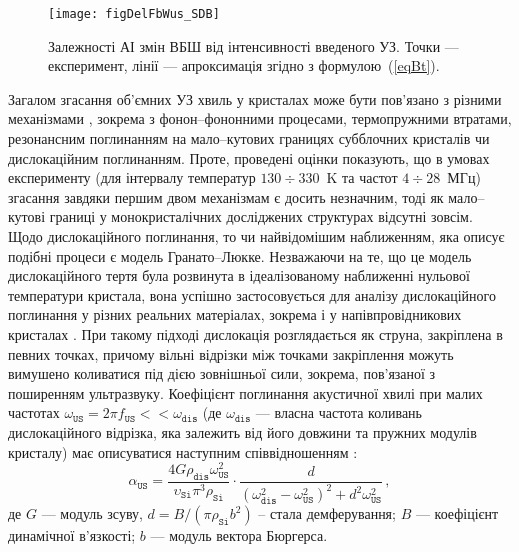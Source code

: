\begin{figure}
\center
\texttt{[image: figDelFbWus\_SDB]}
\caption{\label{figDelFbWus_SDB}
Залежності АІ змін ВБШ від інтенсивності введеного УЗ.
Точки --- експеримент,
лінії --- апроксимація згідно з формулою~(\ref{eqBt}).
}%
\end{figure}

Загалом згасання об'ємних УЗ хвиль у кристалах може бути пов'язано з різними механізмами \cite{True},
зокрема з фонон--фононними процесами,
термопружними втратами, резонансним поглинанням на мало--кутових границях субблочних кристалів чи дислокаційним поглинанням.
Проте, проведені оцінки показують, що в умовах експерименту (для інтервалу температур $130\div330$~K та частот $4\div28$~МГц) згасання завдяки першим двом механізмам
є досить незначним, тоді як мало--кутові границі у монокристалічних досліджених структурах відсутні зовсім.
Щодо дислокаційного поглинання, то чи найвідомішим наближенням, яка описує подібні процеси є модель Гранато--Люкке.
Незважаючи на те, що це модель дислокаційного тертя була розвинута в ідеалізованому наближенні нульової температури кристала, вона успішно застосовується для аналізу
дислокаційного поглинання у різних реальних матеріалах, зокрема і у напівпровідникових кристалах \cite{OstrKorBook,Nik}.
При такому підході дислокація розглядається як струна, закріплена в певних точках, причому вільні відрізки між точками закріплення можуть вимушено коливатися під дією зовнішньої сили, зокрема, пов'язаної з поширенням ультразвуку.
 Коефіцієнт поглинання акустичної хвилі при малих частотах $\omega_\mathtt{US}=2\pi f_\mathtt{US}<<\omega_\mathtt{dis}$
(де $\omega_\mathtt{dis}$ --- власна частота коливань дислокаційного відрізка, яка залежить від його довжини та пружних модулів кристалу)
 має описуватися наступним співвідношенням \cite{Granato,True}:
\begin{equation}
\label{eqAlphsGL}
\alpha_\mathtt{US}=\frac{4G\rho_\mathtt{dis}\omega_\mathtt{US}^2}{\upsilon_\mathtt{Si}\pi^3\rho_\mathtt{Si}}\cdot
    \frac{d}{(\omega_\mathtt{dis}^2-\omega_\mathtt{US}^2)^2+d^2\omega_\mathtt{US}^2}\,,
\end{equation}
де $G$ --- модуль зсуву,
$d = B/(\pi\rho_\mathtt{Si} b^2)$ -- стала демферування;
$B$ --- коефіцієнт динамічної в'язкості;
$b$ --- модуль вектора Бюргерса.

